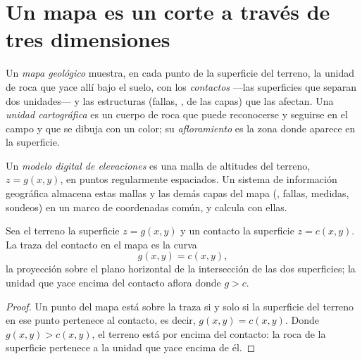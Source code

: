 \section{Un mapa es un corte a través de tres dimensiones}\label{sec:b1:geological-maps:cut}

\begin{definition}\label{def:b1:geological-maps:geological-map}
Un \emph{mapa geológico} muestra, en cada punto de la superficie del
terreno, la unidad de roca que yace allí bajo el suelo, con los \emph{contactos} ---las superficies que separan dos unidades--- y las estructuras (fallas, ,  de las capas) que las afectan. Una \emph{unidad cartográfica} es un cuerpo de roca que puede reconocerse y seguirse en el campo y que se dibuja
con un color; su \emph{afloramiento} es la zona donde aparece en la superficie.
\end{definition}

\begin{definition}\label{def:b1:geological-maps:dem}
Un \emph{modelo digital de elevaciones} es una malla de
altitudes del terreno, $z = g(x,y)$, en puntos regularmente espaciados. Un sistema de información
geográfica almacena estas mallas y las demás capas del mapa (, fallas, medidas, sondeos)
en un marco de coordenadas común, y calcula con ellas.
\end{definition}

\begin{proposition}\label{prop:b1:geological-maps:intersection}
Sea el terreno la superficie $z = g(x,y)$ y un contacto la superficie
$z = c(x,y)$. La traza del contacto en el mapa es la curva
\[
  g(x,y) = c(x,y),
\]
la proyección sobre el plano horizontal de la intersección de las dos superficies;
la unidad que yace encima del contacto aflora donde $g > c$.
\end{proposition}

\begin{proof}
Un punto del mapa está sobre la traza si y solo si la superficie del terreno en ese punto pertenece
al contacto, es decir, $g(x,y) = c(x,y)$. Donde $g(x,y) > c(x,y)$, el terreno está por encima del
contacto: la roca de la superficie pertenece a la unidad que yace encima de él.
\end{proof}

